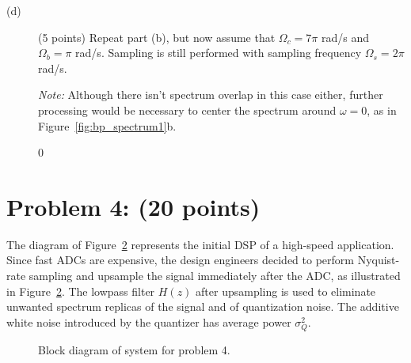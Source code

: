 \documentclass[10pt]{article}
\def\SOLUTIONS{0} %
\begin{document}
\begin{description}
\item[(d)] (5 points) Repeat part (b), but now assume that $\Omega_c = 7\pi$ rad/s and $\Omega_b = \pi$ rad/s. Sampling is still performed with sampling frequency $\Omega_s = 2\pi$ rad/s. 

\textit{Note:} Although there isn't spectrum overlap in this case either, further processing would be necessary to center the spectrum around $\omega = 0$, as in Figure~\ref{fig:bp_spectrum1}b.

\begin{figure}[!h]
\centering
	\def\SolD{1}
	\resizebox{\textwidth}{!}{} \label{fig:bp_spectrum_sol1}
\end{figure}
\if\SOLUTIONS0\vspace{5cm}
\fi

\end{description}

\newpage
\section*{Problem 4: (20 points)}
The diagram of Figure~\ref{fig:sampling_diagram} represents the initial DSP of a high-speed application. Since fast ADCs are expensive, the design engineers decided to perform Nyquist-rate sampling and upsample the signal immediately after the ADC, as illustrated in Figure~\ref{fig:sampling_diagram}. The lowpass filter $H(z)$ after upsampling is used to eliminate unwanted spectrum replicas of the signal and of quantization noise. The additive white  noise introduced by the quantizer has average power $\sigma_Q^2$.

\begin{figure}[!h]
\centering
	\resizebox{\textwidth}{!}{} 
    \caption{Block diagram of system for problem 4.}\label{fig:sampling_diagram}
\end{figure}
\end{document}
